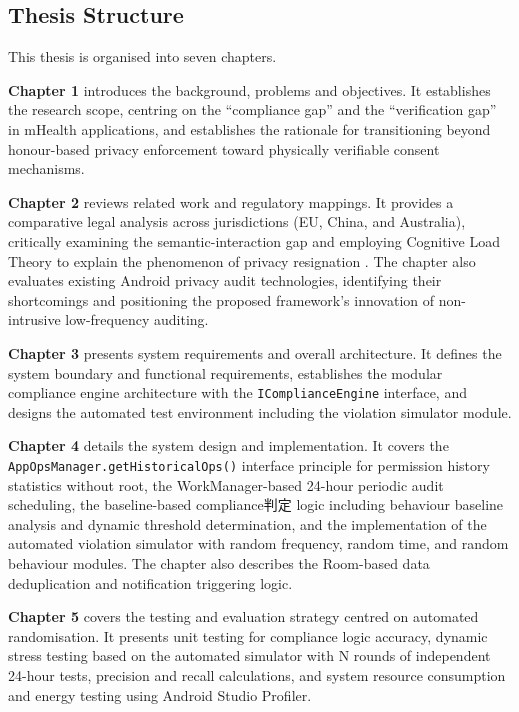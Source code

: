 \subsection{Thesis Structure}

This thesis is organised into seven chapters.

\textbf{Chapter 1} introduces the background, problems and objectives. It establishes the research scope, centring on the ``compliance gap'' and the ``verification gap'' in mHealth applications, and establishes the rationale for transitioning beyond honour-based privacy enforcement toward physically verifiable consent mechanisms.

\textbf{Chapter 2} reviews related work and regulatory mappings. It provides a comparative legal analysis across jurisdictions (EU, China, and Australia), critically examining the semantic-interaction gap and employing Cognitive Load Theory to explain the phenomenon of privacy resignation \cite{dehling2015, choi2018}. The chapter also evaluates existing Android privacy audit technologies, identifying their shortcomings and positioning the proposed framework's innovation of non-intrusive low-frequency auditing.

\textbf{Chapter 3} presents system requirements and overall architecture. It defines the system boundary and functional requirements, establishes the modular compliance engine architecture with the \texttt{IComplianceEngine} interface, and designs the automated test environment including the violation simulator module.

\textbf{Chapter 4} details the system design and implementation. It covers the \texttt{AppOpsManager.getHistoricalOps()} interface principle for permission history statistics without root, the WorkManager-based 24-hour periodic audit scheduling, the baseline-based compliance判定 logic including behaviour baseline analysis and dynamic threshold determination, and the implementation of the automated violation simulator with random frequency, random time, and random behaviour modules. The chapter also describes the Room-based data deduplication and notification triggering logic.

\textbf{Chapter 5} covers the testing and evaluation strategy centred on automated randomisation. It presents unit testing for compliance logic accuracy, dynamic stress testing based on the automated simulator with N rounds of independent 24-hour tests, precision and recall calculations, and system resource consumption and energy testing using Android Studio Profiler.

